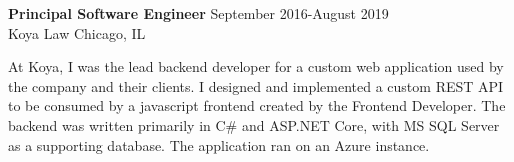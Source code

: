 \textbf{Principal Software Engineer} \hfill September 2016-August 2019 \\
Koya Law \hfill Chicago, IL
\begin{description} \itemsep -2pt %
\item At Koya, I was the lead backend developer for a custom web
application used by the company and their clients. I designed and
implemented a custom REST API to be consumed by a javascript frontend
created by the Frontend Developer. The backend was written primarily in
C\# and ASP.NET Core, with MS SQL Server as a supporting database. The
application ran on an Azure instance.
\end{description}
